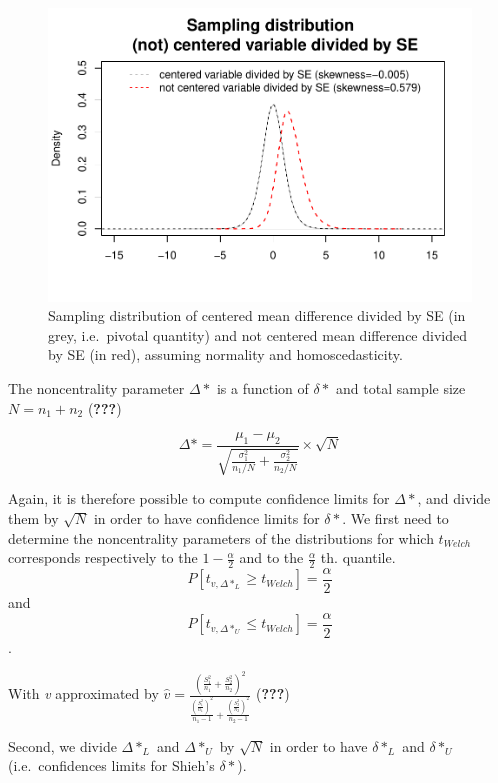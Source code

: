 \documentclass[
  man,floatsintext]{apa6}
\begin{document}
\begin{figure}
\centering
\includegraphics{Appendix2_files/figure-latex/SAMPLMEANDIFF4-1.pdf}
\caption{\label{fig:SAMPLMEANDIFF4}Sampling distribution of centered mean difference divided by SE (in grey, i.e.~pivotal quantity) and not centered mean difference divided by SE (in red), assuming normality and homoscedasticity.}
\end{figure}

The noncentrality parameter \(\Delta*\) is a function of \(\delta*\) and total sample size \(N = n_1 + n_2\) ({\textbf{???}})

\begin{equation}
\Delta* = \frac{\mu_1-\mu_2}{\sqrt{\frac{\sigma_1^2}{n_1/N}+\frac{\sigma_2^2}{n_2/N}}} \times \sqrt{N}
\label{eq:ncp}
\end{equation}

Again, it is therefore possible to compute confidence limits for \(\Delta*\), and divide them by \(\sqrt{N}\) in order to have confidence limits for \(\delta*\). We first need to determine the noncentrality parameters of the distributions for which \(t_{Welch}\) corresponds respectively to the \(1-\frac{\alpha}{2}\) and to the \(\frac{\alpha}{2}\) th. quantile.
\[P[t_{v, \Delta*_L} \geq t_{Welch}] = \frac{\alpha}{2} \] and
\[P[t_{v, \Delta*_U} \leq t_{Welch}] = \frac{\alpha}{2} \].

With \emph{v} approximated by \(\hat{v} = \frac{(\frac{S_1^2}{n_1}+\frac{S_2^2}{n_2})^2}{\frac{(\frac{S_1^2}{n_1})^2}{n_1-1}+\frac{(\frac{S_2^2}{n_2})^2}{n_2-1}}\) ({\textbf{???}})

Second, we divide \(\Delta*_L\) and \(\Delta*_U\) by \(\sqrt{N}\) in order to have \(\delta*_L\) and \(\delta*_U\) (i.e.~confidences limits for Shieh's \(\delta*\)).
\end{document}
